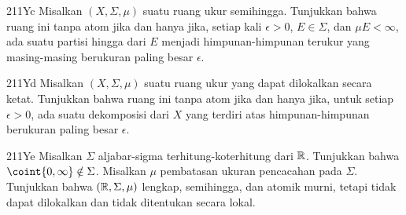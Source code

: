 {\spheader 211Yc Misalkan $(X,\Sigma,\mu)$ suatu ruang ukur semihingga.
Tunjukkan bahwa ruang ini tanpa atom jika dan hanya jika, setiap kali
$\epsilon>0$, $E\in\Sigma$, dan $\mu E<\infty$, ada suatu partisi
hingga dari $E$ menjadi himpunan-himpunan terukur yang masing-masing
berukuran paling besar $\epsilon$.
     
\spheader 211Yd Misalkan $(X,\Sigma,\mu)$ suatu ruang ukur yang dapat
dilokalkan secara ketat.   Tunjukkan bahwa ruang ini tanpa atom jika dan
hanya jika, untuk setiap $\epsilon>0$, ada suatu dekomposisi dari $X$
yang terdiri atas himpunan-himpunan berukuran paling besar $\epsilon$.
     
\spheader 211Ye Misalkan $\Sigma$ aljabar-sigma
terhitung-koterhitung dari $\Bbb R$.   Tunjukkan bahwa
$\coint{0,\infty}\notin\Sigma$.   Misalkan $\mu$ pembatasan ukuran
pencacahan pada $\Sigma$.   Tunjukkan bahwa $(\Bbb R,\Sigma,\mu)$
lengkap, semihingga, dan atomik murni, tetapi tidak dapat dilokalkan dan
tidak ditentukan secara lokal.
}%
     
